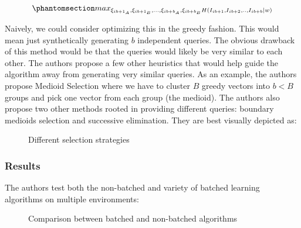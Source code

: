 \documentclass[
  letterpaper,
  numbers=noenddot,
  DIV=11]{scrreprt}
\theoremstyle{definition}
\theoremstyle{plain}
\theoremstyle{plain}
\theoremstyle{remark}
\begin{document}
\begin{equation}\phantomsection\label{eq-eq3.44}{max_{\xi_{ib+1_A}, \xi_{ib+1_B}, ... , \xi_{ib+b_A}, \xi_{ib+b_B} H(I_{ib+1}, I_{ib+2}, .., I_{ib+b} | w)}}\end{equation}

Naively, we could consider optimizing this in the greedy fashion. This
would mean just synthetically generating \(b\) independent queries. The
obvious drawback of this method would be that the queries would likely
be very similar to each other. The authors propose a few other
heuristics that would help guide the algorithm away from generating very
similar queries. As an example, the authors propose Medioid Selection
where we have to cluster \(B\) greedy vectors into \(b < B\) groups and
pick one vector from each group (the medioid). The authors also propose
two other methods rooted in providing different queries: boundary
medioids selection and successive elimination. They are best visually
depicted as:

\begin{figure}


\caption{\label{fig-selection-strategy}Different selection strategies}

\end{figure}%

\subsubsection*{Results}\label{results}

The authors test both the non-batched and variety of batched learning
algorithms on multiple environments:

\begin{figure}


\caption{\label{fig-batch-nonbatch}Comparison between batched and
non-batched algorithms}

\end{figure}%
\end{document}
